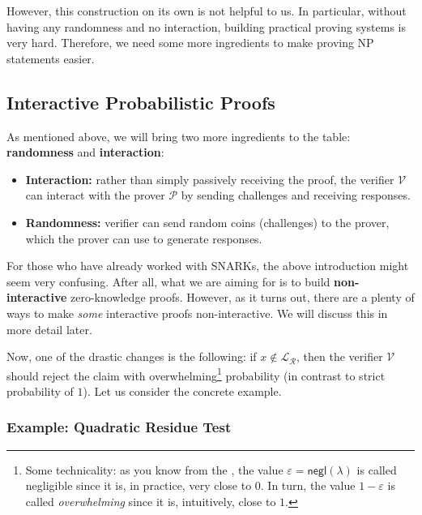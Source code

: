 \documentclass[../../book.tex]{subfiles}
\begin{document}
However, this construction on its own is not helpful to us. In particular, without having any randomness and no interaction, building practical proving systems is very hard. Therefore, we need some more ingredients to make proving NP statements easier.

\subsection{Interactive Probabilistic Proofs}

As mentioned above, we will bring two more ingredients to the table: \textbf{randomness} and \textbf{interaction}:
\begin{itemize}
    \item \textbf{Interaction:} rather than simply passively receiving the proof, the verifier $\mathcal{V}$ can interact with the prover $\mathcal{P}$ by sending challenges and receiving responses.
    \item \textbf{Randomness:} verifier can send random coins (challenges) to the prover, which the prover can use to generate responses.
\end{itemize}

\begin{remark}
    For those who have already worked with SNARKs, the above introduction might seem very confusing. After all, what we are aiming for is to build \textbf{non-interactive} zero-knowledge proofs. However, as it turns out, there are a plenty of ways to make \textit{some} interactive proofs non-interactive. We will discuss this in more detail later.
\end{remark}

Now, one of the drastic changes is the following: if $x \not\in
\mathcal{L}_{\mathcal{R}}$, then the verifier $\mathcal{V}$ should reject the
claim with overwhelming\footnote{Some technicality: as you know from the
, the value $\varepsilon =
\mathsf{negl}(\lambda)$ is called negligible since it is, in practice, very
close to $0$. In turn, the value $1-\varepsilon$ is called \textit{overwhelming}
since it is, intuitively, close to $1$.} probability (in contrast to strict
probability of $1$). Let us consider the concrete example.

\subsubsection{Example: Quadratic Residue Test}\label{section:quadratic_residue_test}
\end{document}
